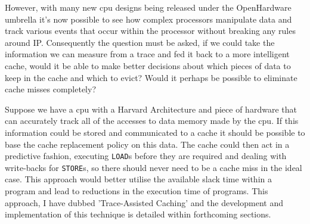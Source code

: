 However, with many new \gls{cpu} designs being released under the OpenHardware \cite{OpenSourceHardware} umbrella it's now possible to see how complex processors manipulate data and track various events that occur within the processor without breaking any rules around IP. Consequently the question must be asked, if we could take the information we can measure from a trace and fed it back to a more intelligent cache, would it be able to make better decisions about which pieces of data to keep in the cache and which to evict? Would it perhaps be possible to eliminate cache misses completely?

Suppose we have a \gls{cpu} with a Harvard Architecture and piece of hardware that can accurately track all of the accesses to data memory made by the \gls{cpu}. If this information could be stored and communicated to a cache it should be possible to base the cache replacement policy on this data. The cache could then act in a predictive fashion, executing \texttt{LOAD}s before they are required and dealing with write-backs for \texttt{STORE}s, so there should never need to be a cache miss in the ideal case. This approach would better utilise the available slack time within a program and lead to reductions in the execution time of programs. This approach, I have dubbed 'Trace-Assisted Caching' and the development and implementation of this technique is detailed within forthcoming sections.


